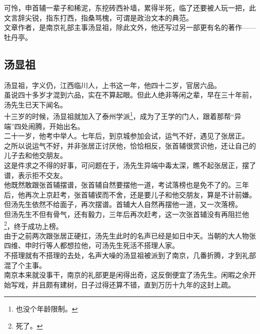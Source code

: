 \begin{multicols}{\theparacolNo}
可怜，申首辅一辈子和稀泥，东挖砖西补墙，累得半死，临了还要被人玩一把，此文言辞尖锐，指东打西，指桑骂槐，可谓是政治文本的典范。\\

文章作者，是南京礼部主事汤显祖，除此文外，他还写过另一部更有名的著作——牡丹亭。\\

\subsection{汤显祖}
汤显祖，字义仍，江西临川人，上书这一年，他四十二岁，官居六品。\\

虽说四十多岁才混到六品，实在不算起眼。但此人绝非等闲之辈，早在三十年前，汤先生已天下闻名。\\

十三岁的时候，汤显祖就加入了泰州学派\footnote{也没个年龄限制。}，成为了王学的门人，跟着那帮“异端”四处闹腾，开始出名。\\

二十一岁，他考中举人。七年后，到京城参加会试，运气不好，遇见了张居正。\\

之所以说运气不好，并非张居正讨厌他，恰恰相反，张首辅很赏识他，还让自己的儿子去和他交朋友。\\

这是件求之不得的好事，可问题在于，汤先生异端中毒太深，瞧不起张居正，摆了谱，表示拒不交友。\\

他既然敢跟张首辅摆谱，张首辅自然要摆他一道，考试落榜也是免不了的。三年后，他再次上京赶考，张首辅锲而不舍，还是要儿子和他交朋友，算是不计前嫌。但汤先生依然不给面子，再次摆谱。首辅大人自然再摆他一道，又一次落榜。\\

但汤先生不但有骨气，还有毅力，三年后再次赶考，这一次张首辅没有再阻拦他\footnote{死了。}，终于成功上榜。\\

由于之前两次跟张居正硬扛，汤先生此时的名声已经是如日中天。当朝的大人物张四维、申时行等人都想拉他，可汤先生死活不搭理人家。\\

不搭理就有不搭理的去处，名声大噪的汤显祖被派到了南京，几番折腾，才到礼部混了个主事。\\

南京本来就没事干，南京的礼部更是闲得出奇，这反倒便宜了汤先生。闲暇之余开始写戏，并且颇有建树，日子过得还算不错，直到万历十九年的这封上疏。\\


\end{multicols}

